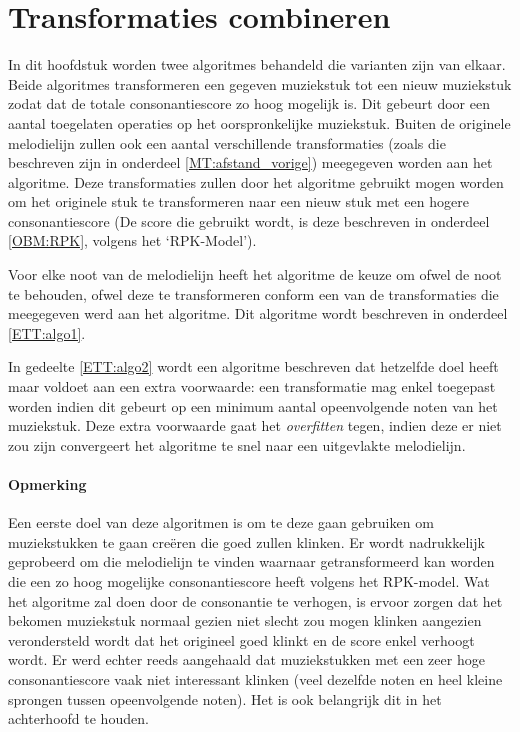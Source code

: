 \chapter{Transformaties combineren}
\label{hoofdstuk:ETT}

In dit hoofdstuk worden twee algoritmes behandeld die varianten zijn van elkaar. Beide algoritmes transformeren een gegeven muziekstuk tot een nieuw muziekstuk zodat dat de totale consonantiescore zo hoog mogelijk is. Dit gebeurt door een aantal toegelaten operaties op het oorspronkelijke muziekstuk. Buiten de originele melodielijn zullen ook een aantal verschillende transformaties (zoals die beschreven zijn in onderdeel \ref{MT:afstand_vorige}) meegegeven worden aan het algoritme. Deze transformaties zullen door het algoritme gebruikt mogen worden om het originele stuk te transformeren naar een nieuw stuk met een hogere consonantiescore (De score die gebruikt wordt, is deze beschreven in onderdeel \ref{OBM:RPK}, volgens het `RPK-Model').

Voor elke noot van de melodielijn heeft het algoritme de keuze om ofwel de noot te behouden, ofwel deze te transformeren conform een van de transformaties die meegegeven werd aan het algoritme. Dit algoritme wordt beschreven in onderdeel \ref{ETT:algo1}. 

In gedeelte \ref{ETT:algo2} wordt een algoritme beschreven dat hetzelfde doel heeft maar voldoet aan een extra voorwaarde: een transformatie mag enkel toegepast worden indien dit gebeurt op een minimum aantal opeenvolgende noten van het muziekstuk. Deze extra voorwaarde gaat het \textit{overfitten} tegen, indien deze er niet zou zijn convergeert het algoritme te snel naar een uitgevlakte melodielijn.

\subsubsection{Opmerking}
Een eerste doel van deze algoritmen is om te deze gaan gebruiken om muziekstukken te gaan cre\"eren die goed zullen klinken. Er wordt nadrukkelijk geprobeerd om die melodielijn te vinden waarnaar getransformeerd kan worden die een zo hoog mogelijke consonantiescore heeft volgens het RPK-model. Wat het algoritme zal doen door de consonantie te verhogen, is ervoor zorgen dat het bekomen muziekstuk normaal gezien niet slecht zou mogen klinken aangezien verondersteld wordt dat het origineel goed klinkt en de score enkel verhoogt wordt. Er werd echter reeds aangehaald dat muziekstukken met een zeer hoge consonantiescore vaak niet interessant klinken (veel dezelfde noten en heel kleine sprongen tussen opeenvolgende noten). Het is ook belangrijk dit in het achterhoofd te houden. 


